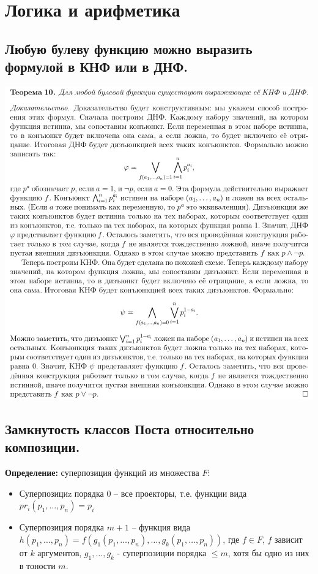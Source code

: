 \section{Логика и арифметика}

\subsection{Любую булеву функцию можно выразить формулой в КНФ или в ДНФ.}

\begin{center}
    \includegraphics[width=0.95\linewidth]{images/1_propositions_knf}
\end{center}

\subsection{Замкнутость классов Поста относительно композиции.}

\textbf{Определение:} суперпозиция функций из множества $F$:
\begin{itemize}
    \item Суперпозициz порядка 0 -- все проекторы, т.е. функции вида $pr_i(p_1,\ldots,p_n)=p_i$
    \item Суперпозиция порядка $m+1$ -- функция вида $h(p_1,\ldots,p_n)=f(g_1(p_1,\ldots,p_n),\ldots,g_k(p_1,\ldots,p_n))$, где $f\in F$, $f$ зависит от $k$ аргументов, $g_1,\ldots,g_k$ - суперпозиции порядка $\leqslant m$, хотя бы одно из них в тоности $m$.
\end{itemize}

